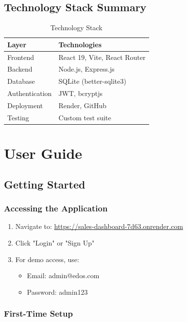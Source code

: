 \documentclass[12pt,a4paper]{article}
\begin{document}
\subsection{Technology Stack Summary}

\begin{table}[h]
\centering
\begin{tabular}{|l|l|}
\hline
\textbf{Layer} & \textbf{Technologies} \\
\hline
Frontend & React 19, Vite, React Router \\
\hline
Backend & Node.js, Express.js \\
\hline
Database & SQLite (better-sqlite3) \\
\hline
Authentication & JWT, bcryptjs \\
\hline
Deployment & Render, GitHub \\
\hline
Testing & Custom test suite \\
\hline
\end{tabular}
\caption{Technology Stack}
\end{table}

\newpage

\section{User Guide}


\subsection{Getting Started}

\subsubsection{Accessing the Application}

\begin{enumerate}[leftmargin=*]
    \item Navigate to: \url{https://sales-dashboard-7d63.onrender.com}
    \item Click "Login" or "Sign Up"
    \item For demo access, use:
    \begin{itemize}
        \item Email: admin@edos.com
        \item Password: admin123
    \end{itemize}
\end{enumerate}

\subsubsection{First-Time Setup}
\end{document}
